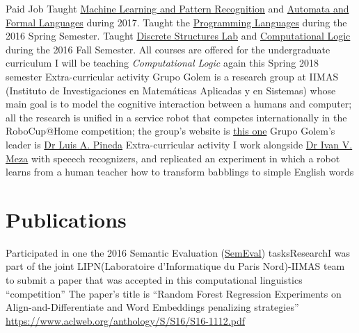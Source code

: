\documentclass[11pt,a4paper,sans]{moderncv} %
\begin{document}
        {Paid Job}
        {Taught \href{http://turing.iimas.unam.mx/~ivanvladimir/page/curso_rpyaa}{Machine Learning and Pattern Recognition} and \href{https://sites.google.com/site/automataslengformales20172/}{Automata and Formal Languages} during 2017. Taught the \href{https://sites.google.com/site/lengprog20162/}{Programming Languages} during the 2016 Spring Semester. Taught \href{https://sites.google.com/a/ciencias.unam.mx/estructuras-discretas/home}{Discrete Structures Lab} and \href{https://sites.google.com/site/logcompunam20171/home}{Computational Logic} during the 2016 Fall Semester. All courses are offered for the undergraduate curriculum}
        {I will be teaching \emph{Computational Logic} again this Spring 2018 semester}{}{}
        {Extra-curricular activity}
        {Grupo Golem is a research group at IIMAS (Instituto de Investigaciones en Matem\'{a}ticas Aplicadas y en Sistemas) whose main goal is to model the cognitive interaction between a humans and computer; all the research is unified in a service robot that competes internationally in the RoboCup@Home competition; the group's website is \href{http://golem.iimas.unam.mx/home.php?lang=en&sec=home}{this one}}
        {Grupo Golem's leader is \href{http://turing.iimas.unam.mx/~luis/}{Dr Luis A. Pineda}}{}{}
        {Extra-curricular activity}
        {I work alongside \href{http://turing.iimas.unam.mx/~ivanvladimir/}{Dr Ivan V. Meza} with speeech recognizers, and replicated an experiment in which a robot learns from a human teacher how to transform babblings to simple English words}
        {}{}{}

\section{Publications}

        {Participated in one the 2016 Semantic Evaluation (\href{http://alt.qcri.org/semeval2016/}{SemEval}) tasks}{Research}{I was part of the joint LIPN(Laboratoire d'Informatique du Paris Nord)-IIMAS team to submit a paper that was accepted in this computational linguistics ``competition''}
        {The paper's title is ``Random Forest Regression Experiments on Align-and-Differentiate and Word Embeddings penalizing strategies''}
        {\url{https://www.aclweb.org/anthology/S/S16/S16-1112.pdf}}
\end{document}
